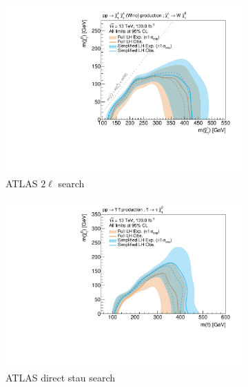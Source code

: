 \begin{figure}
	\par\medskip
	\begin{subfigure}[b]{0.5\textwidth}
		\centering\includegraphics[width=\textwidth]{exclusion_2L0J_noLabel_v3}
		\caption{ATLAS $2\ell$ search~\cite{SUSY-2018-32}\label{fig:results_2L0J}}
	\end{subfigure}\hfill
	\begin{subfigure}[b]{0.5\textwidth}
		\centering\includegraphics[width=\textwidth]{exclusion_directstaus_noLabel_v3}
		\caption{ATLAS direct stau search~\cite{SUSY-2018-04}\label{fig:results_directstaus}}
	\end{subfigure}\hfill
	\par\medskip
	\begin{subfigure}[b]{0.5\textwidth}

\end{subfigure}
\end{figure}
